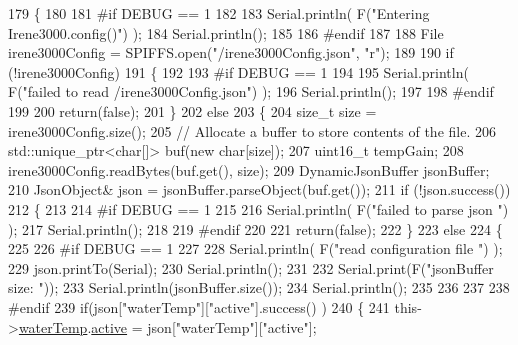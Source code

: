 \begin{DoxyCode}
179 \{
180 
181 \textcolor{preprocessor}{#if DEBUG == 1 }
182 
183     Serial.println( F(\textcolor{stringliteral}{"Entering Irene3000.config()"}) );
184     Serial.println();
185 
186 \textcolor{preprocessor}{#endif}
187 
188     File irene3000Config = SPIFFS.open(\textcolor{stringliteral}{"/irene3000Config.json"}, \textcolor{stringliteral}{"r"});
189 
190     \textcolor{keywordflow}{if} (!irene3000Config) 
191     \{
192     
193 \textcolor{preprocessor}{    #if DEBUG == 1 }
194 
195         Serial.println( F(\textcolor{stringliteral}{"failed to read /irene3000Config.json"}) );
196         Serial.println();
197     
198 \textcolor{preprocessor}{    #endif}
199 
200         \textcolor{keywordflow}{return}(\textcolor{keyword}{false});
201     \}
202     \textcolor{keywordflow}{else}
203     \{
204         \textcolor{keywordtype}{size\_t} size = irene3000Config.size();
205         \textcolor{comment}{// Allocate a buffer to store contents of the file.}
206         std::unique\_ptr<char[]> buf(\textcolor{keyword}{new} \textcolor{keywordtype}{char}[size]);
207             uint16\_t tempGain;
208         irene3000Config.readBytes(buf.get(), size);
209         DynamicJsonBuffer jsonBuffer;
210         JsonObject& json = jsonBuffer.parseObject(buf.get());
211         \textcolor{keywordflow}{if} (!json.success()) 
212         \{
213         
214 \textcolor{preprocessor}{        #if DEBUG == 1 }
215 
216             Serial.println( F(\textcolor{stringliteral}{"failed to parse json "}) );
217             Serial.println();
218         
219 \textcolor{preprocessor}{        #endif}
220             
221             \textcolor{keywordflow}{return}(\textcolor{keyword}{false});
222         \} 
223         \textcolor{keywordflow}{else}
224         \{
225         
226 \textcolor{preprocessor}{        #if DEBUG == 1 }
227     
228             Serial.println( F(\textcolor{stringliteral}{"read configuration file "}) );
229             json.printTo(Serial);
230             Serial.println();
231 
232             Serial.print(F(\textcolor{stringliteral}{"jsonBuffer size: "}));
233             Serial.println(jsonBuffer.size());
234             Serial.println();
235 
236         
237 
238 \textcolor{preprocessor}{        #endif          }
239             \textcolor{keywordflow}{if}(json[\textcolor{stringliteral}{"waterTemp"}][\textcolor{stringliteral}{"active"}].success() )
240             \{           
241                 this->\hyperlink{class_irene3000_af05612c78c758ce9db316c75ad937130}{waterTemp}.\hyperlink{struct_irene3000_1_1state_a879828ace7e7a7bc91ff703bfee36599}{active} = json[\textcolor{stringliteral}{"waterTemp"}][\textcolor{stringliteral}{"active"}]; 

\end{DoxyCode}
